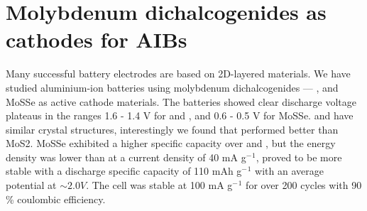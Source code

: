\chapter{Molybdenum dichalcogenides as cathodes for AIBs} %

\label{chap4} %

Many successful battery electrodes are based on 2D-layered materials. We have studied aluminium-ion batteries using molybdenum dichalcogenides --- ,  and MoSSe as active cathode materials. The batteries showed clear discharge voltage plateaus in the ranges 1.6 - 1.4 V for  and , and 0.6 - 0.5 V for MoSSe.  and  have similar crystal structures, interestingly we found that  performed better than MoS2. MoSSe exhibited a higher specific capacity over  and , but the energy density was lower than  at a current density of 40 mA g$^-{^1}$,  proved to be more stable with a discharge specific capacity of 110 mAh g$^-{^1}$ with an average potential at $\sim 2.0 V$. The cell was stable at 100 mA g$^-{^1}$ for over 200 cycles with 90 \% coulombic efficiency. 
